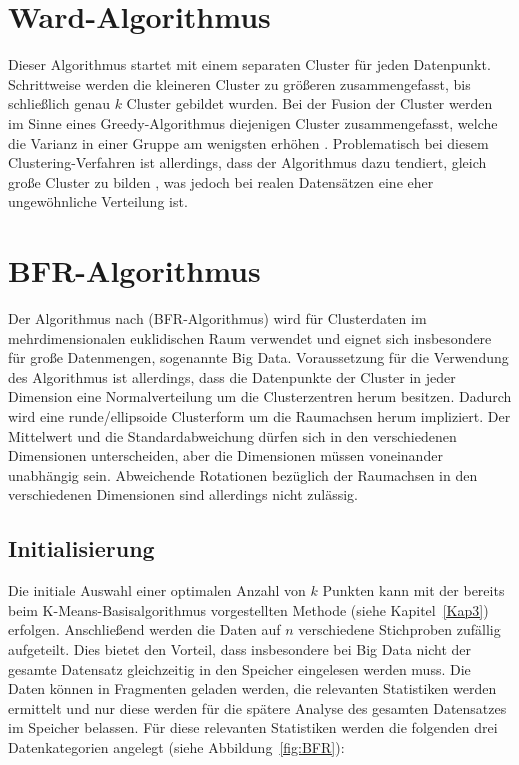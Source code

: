 \documentclass[a4paper,12pt,twoside]{article}
\begin{document}
\section{Ward-Algorithmus} 

Dieser Algorithmus startet mit einem separaten Cluster für jeden Datenpunkt. Schrittweise werden die kleineren Cluster zu größeren  zusammengefasst, bis schließlich genau $ k $ Cluster gebildet wurden. Bei der Fusion der Cluster werden im Sinne eines Greedy-Algorithmus diejenigen Cluster zusammengefasst, welche die Varianz in einer Gruppe am wenigsten erhöhen \citep{Backh2008}. Problematisch bei diesem Clustering-Verfahren ist allerdings, dass der Algorithmus dazu tendiert, gleich große Cluster zu bilden \citep{Vos2004}, was jedoch bei realen Datensätzen eine eher ungewöhnliche Verteilung ist.  

\section{BFR-Algorithmus} 
\label{BFR}
Der Algorithmus nach \citet{Fayyad1998} (BFR-Algorithmus) wird  für Clusterdaten im mehrdimensionalen euklidischen Raum verwendet und eignet sich insbesondere für große Datenmengen, sogenannte Big Data. Voraussetzung für die Verwendung des Algorithmus ist allerdings, dass die Datenpunkte der Cluster in jeder Dimension eine Normalverteilung um die Clusterzentren herum besitzen. Dadurch wird eine runde/ellipsoide Clusterform um die Raumachsen herum impliziert. Der Mittelwert und die Standardabweichung dürfen sich in den verschiedenen Dimensionen unterscheiden, aber die Dimensionen müssen voneinander unabhängig sein. Abweichende Rotationen bezüglich der Raumachsen in den verschiedenen Dimensionen sind allerdings nicht zulässig.

\subsection{Initialisierung} 
Die initiale Auswahl einer optimalen Anzahl von $ k $ Punkten kann mit der bereits beim K-Means-Basisalgorithmus vorgestellten Methode (siehe Kapitel~\ref{Kap3}) erfolgen. Anschließend werden die Daten auf $ n $ verschiedene Stichproben zufällig aufgeteilt. Dies bietet den Vorteil, dass insbesondere bei Big Data nicht der gesamte Datensatz gleichzeitig in den Speicher eingelesen werden muss. Die Daten können in Fragmenten geladen werden, die relevanten Statistiken werden ermittelt und nur diese werden für die spätere Analyse des gesamten Datensatzes im Speicher belassen. Für diese relevanten Statistiken werden die folgenden drei Datenkategorien angelegt (siehe Abbildung~\ref{fig:BFR}):
\end{document}
